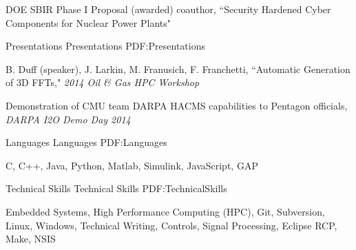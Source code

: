 \documentclass[letterpaper,MMMyyyy,nonstopmode]{simpleresumecv}
\begin{document}
\begin{Body}
\Gap
DOE SBIR Phase I Proposal (awarded) coauthor, ``Security Hardened Cyber Components for Nuclear Power Plants"


\endgroup


\Section
{Presentations}
{Presentations}
{PDF:Presentations}

\begingroup

B. Duff (speaker), J. Larkin, M. Franusich, F. Franchetti,
``Automatic Generation of 3D FFTs,"
\textit{2014 Oil \& Gas HPC Workshop}

\Gap
Demonstration of CMU team DARPA HACMS capabilities to Pentagon officials,
\textit{DARPA I2O Demo Day 2014}
\endgroup



\Section
{Languages}
{Languages}
{PDF:Languages}

\begingroup
C, C++, Java, Python, Matlab, Simulink, JavaScript, GAP
\endgroup


\Section
{Technical Skills}
{Technical Skills}
{PDF:TechnicalSkills}

\begingroup
Embedded Systems, High Performance Computing (HPC), Git, Subversion, Linux, Windows, Technical Writing, Controls, Signal Processing, Eclipse RCP, Make, NSIS 
\endgroup


\end{Body}
\end{document}
